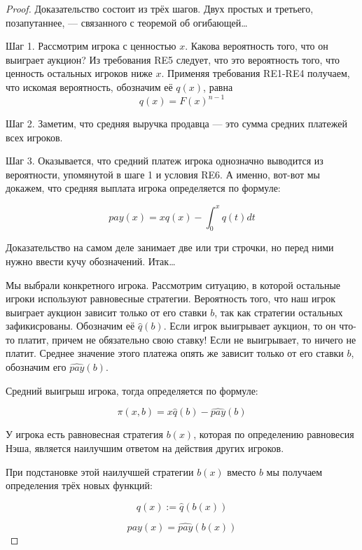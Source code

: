 \begin{proof}

Доказательство состоит из трёх шагов. Двух простых и третьего, позапутаннее, — связанного с теоремой об огибающей\ldots

Шаг 1. Рассмотрим игрока с ценностью $ x $. Какова вероятность того, что он выиграет аукцион? Из требования RE5 следует, что это вероятность того, что ценность остальных игроков ниже $ x $. Применяя требования RE1-RE4 получаем, что искомая вероятность, обозначим её $ q(x) $, равна
\[ q(x)=F(x)^{n-1} \]

Шаг 2. Заметим, что средняя выручка продавца — это сумма средних платежей всех игроков.


Шаг 3. Оказывается, что средний платеж игрока однозначно выводится из вероятности, упомянутой в шаге 1 и условия RE6. А именно, вот-вот мы докажем, что средняя выплата игрока определяется по формуле:

\begin{equation}
\label{pay_eq}
pay(x)=xq(x)-\int_{0}^{x}q(t)dt
\end{equation}

Доказательство на самом деле занимает две или три строчки, но перед ними нужно ввести кучу обозначений. Итак\ldots

Мы выбрали конкретного игрока. Рассмотрим ситуацию, в которой остальные игроки используют равновесные стратегии. Вероятность того, что наш игрок выиграет аукцион зависит только от его ставки $ b $, так как стратегии остальных зафикисрованы. Обозначим её $ \widehat{q}(b) $. Если игрок выигрывает аукцион, то он что-то платит, причем не обязательно свою ставку! Если не выигрывает, то ничего не платит. Среднее значение этого платежа опять же зависит только от его ставки $ b $, обозначим его $ \widehat{pay}(b) $.

Средний выигрыш игрока, тогда определяется по формуле:

\begin{equation}
\pi(x,b)=x\widehat{q}(b)-\widehat{pay}(b)
\end{equation}

У игрока есть равновесная стратегия $ b(x) $, которая по определению равновесия Нэша, является наилучшим ответом на действия других игроков.

При подстановке этой наилучшей стратегии  $ b(x) $ вместо $ b $ мы получаем определения трёх новых функций:

\[ q(x):=\widehat{q}(b(x)) \]

\[ pay(x)=\widehat{pay}(b(x)) \]


\end{proof}
